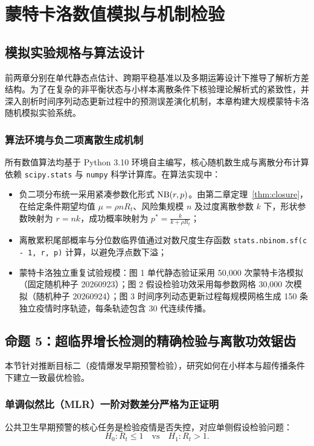 \chapter{蒙特卡洛数值模拟与机制检验}\label{ch:simulations}

\section{模拟实验规格与算法设计}\label{sec:sim_spec}

前两章分别在单代静态点估计、跨期平稳基准以及多期运筹设计下推导了解析方差结构。为了在复杂的非平衡状态与小样本离散条件下核验理论解析式的紧致性，并深入剖析时间序列动态更新过程中的预测误差演化机制，本章构建大规模蒙特卡洛随机模拟实验系统。

\subsection{算法环境与负二项离散生成机制}
所有数值算法均基于 Python 3.10 环境自主编写，核心随机数生成与离散分布计算依赖 \texttt{scipy.stats} 与 \texttt{numpy} 科学计算库。在算法实现中：
\begin{itemize}
    \item 负二项分布统一采用紧凑参数化形式 $\operatorname{NB}(r, p)$。由第二章定理~\ref{thm:closure}，在给定条件期望均值 $\mu = \rho n R_t$、风险集规模 $n$ 及过度离散参数 $k$ 下，形状参数映射为 $r = nk$，成功概率映射为 $p^* = \frac{k}{k + \rho R_t}$；
    \item 离散累积尾部概率与分位数临界值通过对数尺度生存函数 \texttt{stats.nbinom.sf(c - 1, r, p)} 计算，以避免浮点数下溢；
    \item 蒙特卡洛独立重复试验规模：图 1 单代静态验证采用 50,000 次蒙特卡洛模拟（固定随机种子 20260923）；图 2 假设检验功效采用每参数网格 30,000 次模拟（随机种子 20260924）；图 3 时间序列动态更新过程每规模网格生成 150 条独立疫情时序轨迹，每条轨迹包含 30 代连续传播。
\end{itemize}

\section{命题 5：超临界增长检测的精确检验与离散功效锯齿}\label{sec:prop5_power}

本节针对推断目标二（疫情爆发早期预警检验），研究如何在小样本与超传播条件下建立一致最优检验。

\subsection{单调似然比（MLR）一阶对数差分严格为正证明}
公共卫生早期预警的核心任务是检验疫情是否失控，对应单侧假设检验问题：
\begin{equation}
H_0: R_t \le 1 \quad \text{vs} \quad H_1: R_t > 1. \label{eq:hypothesis_testing}
\end{equation}

